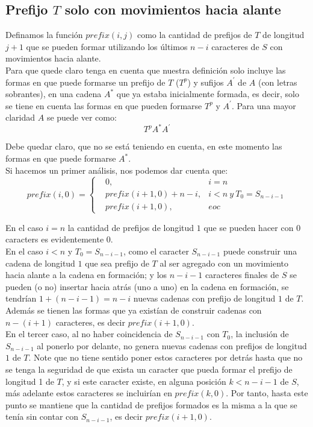 \documentclass[a4paper]{article}
\begin{document}
    \subsection*{Prefijo $T$ solo con movimientos hacia alante}

    Definamos la funci\'on $prefix(i,j)$ como la cantidad de prefijos de $T$ de longitud $j + 1$ que se pueden formar utilizando los \'ultimos $n - i$ caracteres de $S$ con movimientos hacia alante.\\
    
    Para que quede claro tenga en cuenta que nuestra definición solo incluye las formas en que puede formarse un prefijo de $T$ ($T^p$) y sufijos $A^\prime$ de $A$ (con letras sobrantes), en una cadena $A^*$ que ya estaba inicialmente formada, es decir, solo se tiene en cuenta las formas en que pueden formarse $T^p$ y $A^\prime$. Para una mayor claridad $A$ se puede ver como:
    $$T^pA^*A^\prime$$
    
    Debe quedar claro, que no se está teniendo en cuenta, en este momento las formas en que puede formarse $A^*$.\\

    Si hacemos un primer an\'alisis, nos podemos dar cuenta que:
    $$prefix(i,0) = \left\{ \begin{aligned}
        &0,& i = n \\
        & prefix(i+1,0) + n -i,& i < n~ y~ T_0=S_{n-i-1} \\
        &prefix(i+1,0), & eoc
    \end{aligned}\right.$$

    En el caso $i = n$ la cantidad de prefijos de longitud $1$ que se pueden hacer con $0$ caracters es evidentemente $0$.\\
    
    En el caso $i < n$ y $T_0=S_{n-i-1}$, como el caracter $S_{n-i-1}$ puede construir una cadena de longitud $1$ que sea prefijo de $T$ al ser agregado con un movimiento hacia alante a la cadena en formaci\'on; y 
    los $n-i-1$ caracteres finales de $S$ se pueden (o no) insertar hacia atr\'as (uno a uno) en la cadena en formaci\'on, se tendr\'ian $1 + (n-i-1) = n-i$ nuevas cadenas con prefijo de longitud $1$ de $T$.
    Adem\'as
    se tienen las formas que ya exist\'ian de construir cadenas con $n-(i+1)$ caracteres, es decir $prefix(i+1, 0)$.\\ 

    En el tercer caso, al no haber coincidencia de $S_{n-i-1}$ con $T_0$, la inclusi\'on de $S_{n-i-1}$ al ponerlo por delante, no genera nuevas cadenas con prefijos de longitud $1$ de $T$.
    Note que no tiene sentido poner estos caracteres por detr\'as hasta que no se tenga la seguridad
    de que exista un caracter que pueda formar el prefijo de longitud 1 de $T$, y si este caracter existe,
    en alguna posici\'on $k < n-i-1$ de $S$,
    m\'as adelante estos caracteres se incluir\'ian en $prefix(k, 0)$.
    Por tanto, hasta este punto se 
    mantiene que la cantidad de prefijos formados es la misma a la que se ten\'ia sin contar con $S_{n-i-1}$, es decir $prefix(i+1,0)$.\\
    
\end{document}
